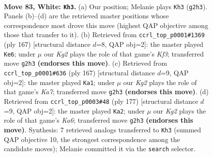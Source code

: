 \documentclass[11pt]{article}
\begin{document}
\clearpage

\begin{figure}[p]\centering
\begin{subfigure}{0.46\textwidth}\centering
\resizebox{\linewidth}{!}{%
\newchessgame
\chessboard[
  setfen={5rk1/P7/8/8/8/8/6K1/3R4 w - - 35 83},
  showmover=false,
  pgfstyle=straightmove, color=movearrow, markmove={g2-h3}
]}
\caption{}
\end{subfigure}\hfill
\begin{subfigure}{0.46\textwidth}\centering
\resizebox{\linewidth}{!}{%
\newchessgame
\chessboard[
  setfen={8/8/5k2/R7/K7/8/8/8 b - - 1 84},
  showmover=false,
  pgfstyle=straightmove, color=movearrow, markmove={f6-e6}
]}
\caption{}
\end{subfigure}
\\[4pt]
\begin{subfigure}{0.46\textwidth}\centering
\resizebox{\linewidth}{!}{%
\newchessgame
\chessboard[
  setfen={8/8/8/8/KR6/8/k7/8 b - - 21 84},
  showmover=false,
  pgfstyle=straightmove, color=movearrow, markmove={a2-a1}
]}
\caption{}
\end{subfigure}\hfill
\begin{subfigure}{0.46\textwidth}\centering
\resizebox{\linewidth}{!}{%
\newchessgame
\chessboard[
  setfen={8/8/8/KR6/8/k7/8/8 b - - 12 89},
  showmover=false,
  pgfstyle=straightmove, color=movearrow, markmove={a3-a2}
]}
\caption{}
\end{subfigure}
\caption{\textbf{Move 83, White: \texttt{Kh3}.} (a) Our position; Melanie plays \texttt{Kh3} (\texttt{g2h3}). Panels (b)--(d) are the retrieved master positions whose correspondence most drove this move (highest QAP objective among those that transfer to it). (b) Retrieved from \texttt{ccrl\_top\_p0001\#1369} (ply 167) [structural distance $d$=8, QAP obj=2]: the master played \texttt{Ke6}; under $\mu$ our \emph{Kg2} plays the role of that game's \emph{Kf3}; transferred move \texttt{g2h3} \textbf{(endorses this move)}. (c) Retrieved from \texttt{ccrl\_top\_p0001\#636} (ply 167) [structural distance $d$=9, QAP obj=2]: the master played \texttt{Ka1}; under $\mu$ our \emph{Kg2} plays the role of that game's \emph{Ka7}; transferred move \texttt{g2h3} \textbf{(endorses this move)}. (d) Retrieved from \texttt{ccrl\_top\_p0003\#48} (ply 177) [structural distance $d$=9, QAP obj=2]: the master played \texttt{Ka2}; under $\mu$ our \emph{Kg2} plays the role of that game's \emph{Ka6}; transferred move \texttt{g2h3} \textbf{(endorses this move)}. Synthesis: 7 retrieved analogs transferred to \texttt{Kh3} (summed QAP objective 10, the strongest correspondence among the candidate moves); Melanie committed it via the \texttt{search} selector.}
\label{fig:thought-m164}
\end{figure}
\end{document}
